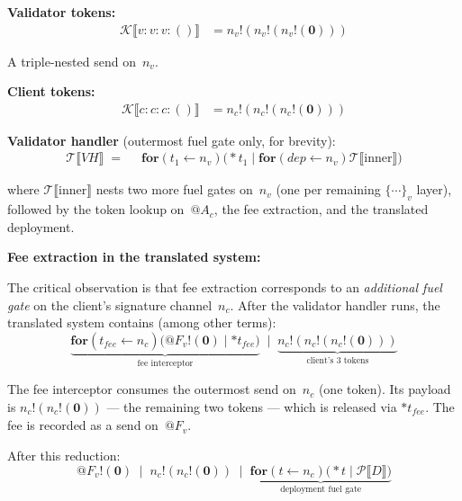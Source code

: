 \documentclass[11pt,a4paper]{article}
\makeatletter
\newcommand{\lsem}{\llbracket}
\newcommand{\rsem}{\rrbracket}
\newcommand{\Par}{\mathbin{|}}
\newcommand{\forc}{\mathbf{for}}
\newcommand{\send}[2]{#1 !\!\left( #2 \right)}
\newcommand{\recv}[3]{\forc\!\left( #1 \leftarrow #2 \right) #3}
\newcommand{\nil}{\mathbf{0}}
\newcommand{\drop}[1]{{\ast} #1}
\newcommand{\quot}[1]{@#1}
\newcommand{\signed}[2]{\{#1\}_{#2}}
\makeatother
\begin{document}
\medskip
\noindent
\textbf{Validator tokens:}
\begin{align*}
  \mathcal{K}\lsem v : v : v : () \rsem
  &= \send{n_v}{\send{n_v}{\send{n_v}{\nil}}}
\end{align*}

\noindent
A triple-nested send on~$n_v$.

\medskip
\noindent
\textbf{Client tokens:}
\begin{align*}
  \mathcal{K}\lsem c : c : c : () \rsem
  &= \send{n_c}{\send{n_c}{\send{n_c}{\nil}}}
\end{align*}

\medskip
\noindent
\textbf{Validator handler} (outermost fuel gate only,
for brevity):
\begin{align*}
  \mathcal{T}\lsem \mathit{VH} \rsem
  \;=\;\;
  &\recv{t_1}{n_v}{\bigl(
    \drop{t_1} \Par
    \recv{\mathit{dep}}{n_v}{\mathcal{T}\lsem\text{inner}\rsem}
  \bigr)}
\end{align*}

\noindent
where $\mathcal{T}\lsem\text{inner}\rsem$ nests two more
fuel gates on~$n_v$ (one per remaining $\signed{\cdots}{v}$
layer), followed by the token lookup on~$\quot{A_c}$, the
fee extraction, and the translated deployment.

\medskip
\noindent
\textbf{Fee extraction in the translated system:}

The critical observation is that fee extraction corresponds to
an \emph{additional fuel gate} on the client's signature
channel~$n_c$.  After the validator handler runs, the
translated system contains (among other terms):
\begin{equation}
  \underbrace{
    \recv{t_{\mathit{fee}}}{n_c}{
      \bigl(
        \send{\quot{F_v}}{\nil}
        \Par \drop{t_{\mathit{fee}}}
      \bigr)
    }
  }_{\text{fee interceptor}}
  \;\Par\;
  \underbrace{
    \send{n_c}{\send{n_c}{\send{n_c}{\nil}}}
  }_{\text{client's 3 tokens}}
  \label{eq:fee-interceptor}
\end{equation}

\noindent
The fee interceptor consumes the outermost send on~$n_c$
(one token).  Its payload is
$\send{n_c}{\send{n_c}{\nil}}$ --- the remaining two
tokens --- which is released via $\drop{t_{\mathit{fee}}}$.
The fee is recorded as a send on~$\quot{F_v}$.

After this reduction:
\[
  \send{\quot{F_v}}{\nil}
  \;\Par\;
  \send{n_c}{\send{n_c}{\nil}}
  \;\Par\;
  \underbrace{
    \recv{t}{n_c}{
      \bigl(\drop{t} \Par
        \mathcal{P}\lsem D \rsem
      \bigr)
    }
  }_{\text{deployment fuel gate}}
\]
\end{document}
